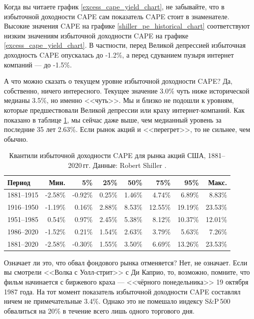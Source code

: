 Когда вы читаете график \ref{excess_cape_yield_chart}, не забывайте, что в 
избыточной доходности CAPE сам показатель CAPE стоит в знаменателе. Высокие 
значения CAPE на графике \ref{shiller_pe_historical_chart} соответствуют 
низким значениям избыточной доходности CAPE на графике  
\ref{excess_cape_yield_chart}. В частности, перед Великой 
депрессией избыточная доходность CAPE опускалась до -1.2\%, а перед сдуванием 
пузыря интернет компаний --- до -1.5\%.

А что можно сказать о текущем уровне избыточной доходности CAPE? Да, 
собственно, ничего интересного. Текущее значение 3.0\% чуть ниже исторической 
медианы 3.5\%, но именно <<чуть>>. Мы и близко не подошли к уровням, которые 
предшествовали Великой депрессии или краху интернет-компаний. Как показано в 
таблице \ref{cape_excess_yield_quantiles_table}, мы сейчас даже выше, чем 
медианный уровень за последние 35 лет 2.63\%. Если рынок акций и 
<<перегрет>>, то не сильнее, чем обычно.

\begin{table}[h!]
\centering
\begin{tabular}{l|r|r|r|r|r|r|r}
Период       & Мин.      & 5\%       & 25\%   & 50\%    & 75\%      & 95\% & Макс. \\ \hline
1881--1915 & -2.58\% & -0.92\% & 0.25\% & 1.46\% &   4.74\% & 6.89\%  & 8.83\% \\
1916--1950 & -1.19\% &  0.16\% & 2.88\% & 8.53\% & 12.55\%  & 19.19\% & 23.53\% \\
1951--1985 &  0.54\% &  0.97\% & 2.45\% & 5.38\% &   8.12\%  & 10.37\% & 12.01\% \\
1986--2020 & -1.52\% &  0.21\% & 1.54\% & 2.63\% &   3.79\%  & 5.63\%  & 7.26\% \\ \hline
1881--2020 & -2.58\% & -0.30\% & 1.55\% & 3.50\% &   6.69\%  & 13.26\% & 23.53\%
\end{tabular}
\caption{Квантили избыточной доходности CAPE для рынка акций США, 1881--2020\,гг. Данные: Robert Shiller \cite{shillerOnline}.}
\label{cape_excess_yield_quantiles_table}
\end{table}

Означает ли это, что обвал фондового рынка отменяется? Нет, не означает. Если 
вы смотрели <<Волка с Уолл-стрит>> с Ди Каприо, то, возможно, помните, что 
фильм начинается с биржевого краха --- <<чёрного понедельника>> 19 октября 
1987 года. На тот момент показатель избыточной доходности CAPE составлял ничем 
не примечательные 3.4\%. Однако это не помешало индексу S\&P\,500 обвалиться 
на 20\% в течение всего лишь одного торгового дня. 


